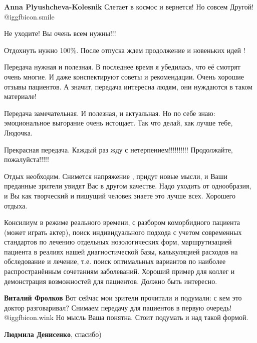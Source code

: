 \begin{itemize}
\begin{itemize}
\textbf{Anna Plyushcheva-Kolesnik} Слетает в космос и вернется! Но совсем Другой!  @igg{fbicon.smile} 
\end{itemize} %

Не уходите! Вы очень всем нужны!!!

Отдохнуть нужно 100\%. После отпуска ждем продолжение и новеньких идей !


Передача нужная и полезная. В последнее время я убедилась, что её смотрят очень
многие. И даже конспектируют советы и рекомендации. Очень хорошие отзывы
пациентов. А значит, передача интересна людям, они нуждаются в таком материале!


Передача замечательная. И полезная, и актуальная. Но по себе знаю:
эмоциональное выгорание очень истощает. Так что делай, как лучше тебе, Людочка.

Прекрасная передача. Каждый раз жду с нетерпением!!!!!!!!!!
Продолжайте, пожалуйста!!!!!


Отдых необходим. Снимется напряжение , придут новые мысли, и Ваши преданные
зрители увидят Вас в другом качестве. Надо уходить от однообразия, и Вы как
творческий и пишущий человек знаете это лучше всех. Хорошего отдыха.


Консилиум в режиме реального времени, с разбором коморбидного пациента (может
играть актер), поиск индивидуального подхода с учетом современных стандартов по
лечению отдельных нозологических форм, маршрутизацией пациента в реалиях нашей
диагностической базы, калькуляцией расходов на обследование и лечение, т.е.
поиск оптимальных вариантов по наиболее распространённым сочетаниям
заболеваний. Хороший пример для коллег и демонстрация возможностей для
пациентов. Должно быть интересно.

\begin{itemize} %
\textbf{Виталий Фролков} Вот сейчас мои зрители прочитали и подумали: с кем это доктор разговаривал? Снимаем передачу для пациентов в первую очередь!  @igg{fbicon.wink}  Но мысль Ваша понятна. Стоит подумать и над такой формой.

\textbf{Людмила Денисенко}, спасибо)
\end{itemize} %


\end{itemize}
